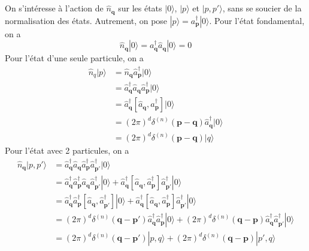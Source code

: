 \documentclass{article}
\numberwithin{equation}{section}
\begin{document}
\subsection{}
On s'intéresse à l'action de $\hat{n}_{\mathbf{q}}$ sur les états $| 0 \rangle$, $| p \rangle $ et $|p, p' \rangle $, sans se soucier 
de la normalisation des états. Autrement, on pose $| p \rangle  = a^{\dagger}_{\mathbf{p}} | 0 \rangle $.
Pour l'état fondamental, on a
\begin{equation}
        \hat{n}_{\mathbf{q}}| 0 \rangle  = a^{\dagger}_{\mathbf{q}} \hat{a}_{\mathbf{q}} | 0 \rangle = 0
\end{equation} 
Pour l'état d'une seule particule, on a
\begin{align*}
        \hat{n}_{q} | p \rangle &=  \hat{n}_{\mathbf{q}} \hat{a}^{\dagger}_{\mathbf{p}} | 0 \rangle  \\
                        &= \hat{a}^{\dagger}_{\mathbf{q}} \hat{a}_{\mathbf{q}} \hat{a}^{\dagger}_{\mathbf{p}} | 0 \rangle \\
                        &= \hat{a}^{\dagger}_{\mathbf{q}}[\hat{a}_{\mathbf{q}}, \hat{a}^{\dagger}_{\mathbf{p}}] | 0 \rangle \\
                        &= (2\pi)^{d}\delta^{(n)}(\mathbf{p} - \mathbf{q})\hat{a}^{\dagger}_{\mathbf{q}} | 0 \rangle \\
                        &= (2\pi)^{d}\delta^{(n)}(\mathbf{p} - \mathbf{q})| q \rangle 
\end{align*}
Pour l'état avec 2 particules, on a
\begin{align*}
        \hat{n}_{\mathbf{q}} | p, p' \rangle  &= \hat{a}^{\dagger}_{\mathbf{q}} \hat{a}_{\mathbf{q}} \hat{a}^{\dagger}_{\mathbf{p}}\hat{a}^{\dagger}_{\mathbf{p}'} | 0 \rangle  \\
        &= \hat{a}^{\dagger}_{\mathbf{q}} \hat{a}^{\dagger}_{\mathbf{p}}\hat{a}_{\mathbf{q}} \hat{a}^{\dagger}_{\mathbf{p}'} | 0 \rangle 
        + \hat{a}^{\dagger}_{\mathbf{q}}[ \hat{a}_{\mathbf{q}}, \hat{a}^{\dagger}_{\mathbf{p}}]\hat{a}^{\dagger}_{\mathbf{p}'} | 0 \rangle  \\
        &= \hat{a}^{\dagger}_{\mathbf{q}} \hat{a}^{\dagger}_{\mathbf{p}}[\hat{a}_{\mathbf{q}}, \hat{a}^{\dagger}_{\mathbf{p}'}] | 0 \rangle 
        + \hat{a}^{\dagger}_{\mathbf{q}}[ \hat{a}_{\mathbf{q}}, \hat{a}^{\dagger}_{\mathbf{p}}]\hat{a}^{\dagger}_{\mathbf{p}'} | 0 \rangle  \\
        &= (2\pi)^{d}\delta^{(n)}(\mathbf{q} - \mathbf{p}')\hat{a}^{\dagger}_{\mathbf{q}} \hat{a}^{\dagger}_{\mathbf{p}}| 0 \rangle 
        + (2\pi)^{d}\delta^{(n)}(\mathbf{q} - \mathbf{p})\hat{a}^{\dagger}_{\mathbf{q}}\hat{a}^{\dagger}_{\mathbf{p}'} | 0 \rangle  \\
        &= (2\pi)^{d}\delta^{(n)}(\mathbf{q} - \mathbf{p}')| p, q \rangle 
        + (2\pi)^{d}\delta^{(n)}(\mathbf{q} - \mathbf{p})| p', q \rangle  \\
\end{align*}
\end{document}
